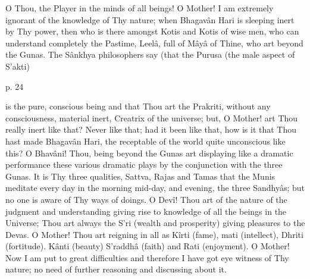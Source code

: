 O Thou, the Player in the minds of all beings! O Mother! I am extremely ignorant of the knowledge of Thy nature; when Bhagavân Hari is sleeping inert by Thy power, then who is there amongst Kotis and Kotis of wise men, who can understand completely the Pastime, Leelâ, full of Mâyâ of Thine, who art beyond the Gunas. The Sânkhya philosophers say (that the Purusa (the male aspect of S’akti)

 

p. 24

 

is the pure, conscious being and that Thou art the Prakriti, without any consciousness, material inert, Creatrix of the universe; but, O Mother! art Thou really inert like that? Never like that; had it been like that, how is it that Thou hast made Bhagavân Hari, the receptable of the world quite unconscious like this? O Bhavâni! Thou, being beyond the Gunas art displaying like a dramatic performance these various dramatic plays by the conjunction with the three Gunas. It is Thy three qualities, Sattva, Rajas and Tamas that the Munis meditate every day in the morning mid-day, and evening, the three Sandhyâs; but no one is aware of Thy ways of doings. O Devî! Thou art of the nature of the judgment and understanding giving rise to knowledge of all the beings in the Universe; Thou art always the S’ri (wealth and prosperity) giving pleasures to the Devas. O Mother! Thou art reigning in all as Kîrti (fame), mati (intellect), Dhriti (fortitude). Kânti (beauty) S’raddhâ (faith) and Rati (enjoyment). O Mother! Now I am put to great difficulties and therefore I have got eye witness of Thy nature; no need of further reasoning and discussing about it.

 

